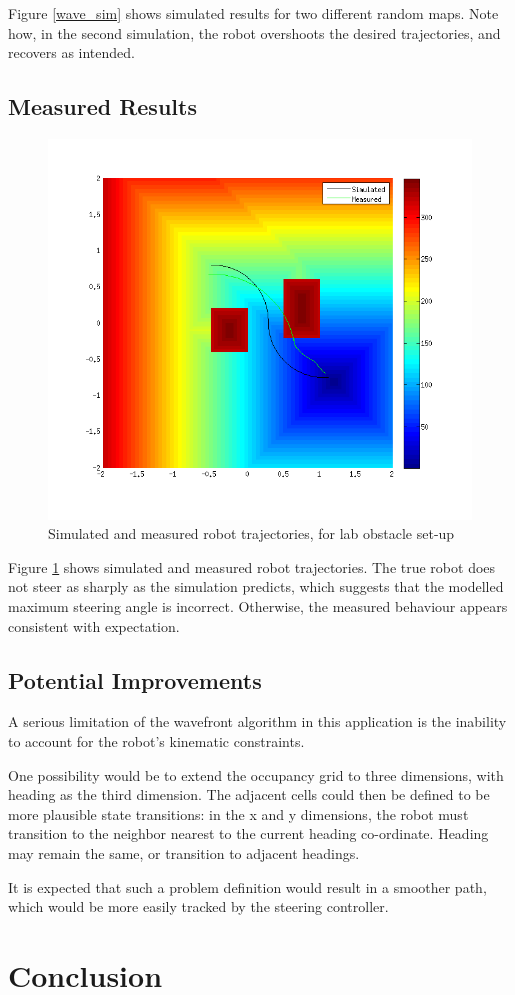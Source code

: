 \documentclass[11pt]{article} %
\begin{document}
Figure \ref{wave_sim} shows simulated results for two different random maps.  Note how, in the second simulation, the robot overshoots the desired trajectories, and recovers as intended.

\clearpage
\subsection{Measured Results}

\begin{figure} [hbt]
 \centering
 \includegraphics[scale=0.75]{wavefront_meas.png}
 \caption{Simulated and measured robot trajectories, for lab obstacle set-up}
 \label{wave_meas}
\end{figure}

Figure \ref{wave_meas} shows simulated and measured robot trajectories.  The true robot does not steer as sharply as the simulation predicts, which suggests that the modelled maximum steering angle is incorrect.  Otherwise, the measured behaviour appears consistent with expectation.

\subsection{Potential Improvements}
A serious limitation of the wavefront algorithm in this application is the inability to account for the robot's kinematic constraints.  

One possibility would be to extend the occupancy grid to three dimensions, with heading as the third dimension.  The adjacent cells could then be defined to be more plausible state transitions:  in the x and y dimensions, the robot must transition to the neighbor nearest to the current heading co-ordinate.  Heading may remain the same, or transition to adjacent headings.

It is expected that such a problem definition would result in a smoother path, which would be more easily tracked by the steering controller.

\section*{Conclusion}
\end{document}
